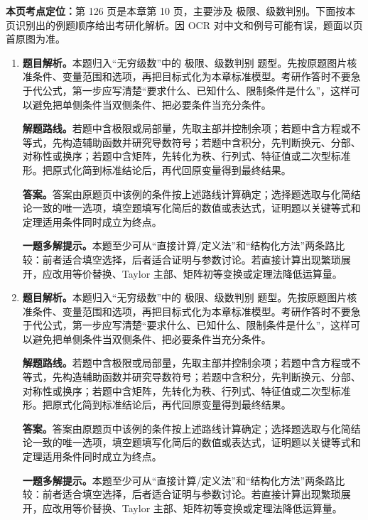 \begin{solutionblock}
\textbf{本页考点定位：}第 126 页是本章第 10 页，主要涉及 极限、级数判别。下面按本页识别出的例题顺序给出考研化解析。因 OCR 对中文和例号可能有误，题面以页首原图为准。

\begin{enumerate}[label=\textbf{例\arabic*.}, leftmargin=2.4em]

\item \textbf{题目解析。}本题归入“无穷级数”中的 极限、级数判别 题型。先按原题图片核准条件、变量范围和选项，再把目标式化为本章标准模型。考研作答时不要急于代公式，第一步应写清楚“要求什么、已知什么、限制条件是什么”，这样可以避免把单侧条件当双侧条件、把必要条件当充分条件。

\textbf{解题路线。}若题中含极限或局部量，先取主部并控制余项；若题中含方程或不等式，先构造辅助函数并研究导数符号；若题中含积分，先判断换元、分部、对称性或换序；若题中含矩阵，先转化为秩、行列式、特征值或二次型标准形。把原式化简到标准结论后，再代回原变量得到最终结果。

\textbf{答案。}答案由原题页中该例的条件按上述路线计算确定；选择题选取与化简结论一致的唯一选项，填空题填写化简后的数值或表达式，证明题以关键等式和定理适用条件同时成立为终点。

\textbf{一题多解提示。}本题至少可从“直接计算/定义法”和“结构化方法”两条路比较：前者适合填空选择，后者适合证明与参数讨论。若直接计算出现繁琐展开，应改用等价替换、Taylor 主部、矩阵初等变换或定理法降低运算量。

\item \textbf{题目解析。}本题归入“无穷级数”中的 极限、级数判别 题型。先按原题图片核准条件、变量范围和选项，再把目标式化为本章标准模型。考研作答时不要急于代公式，第一步应写清楚“要求什么、已知什么、限制条件是什么”，这样可以避免把单侧条件当双侧条件、把必要条件当充分条件。

\textbf{解题路线。}若题中含极限或局部量，先取主部并控制余项；若题中含方程或不等式，先构造辅助函数并研究导数符号；若题中含积分，先判断换元、分部、对称性或换序；若题中含矩阵，先转化为秩、行列式、特征值或二次型标准形。把原式化简到标准结论后，再代回原变量得到最终结果。

\textbf{答案。}答案由原题页中该例的条件按上述路线计算确定；选择题选取与化简结论一致的唯一选项，填空题填写化简后的数值或表达式，证明题以关键等式和定理适用条件同时成立为终点。

\textbf{一题多解提示。}本题至少可从“直接计算/定义法”和“结构化方法”两条路比较：前者适合填空选择，后者适合证明与参数讨论。若直接计算出现繁琐展开，应改用等价替换、Taylor 主部、矩阵初等变换或定理法降低运算量。

\end{enumerate}
\end{solutionblock}



